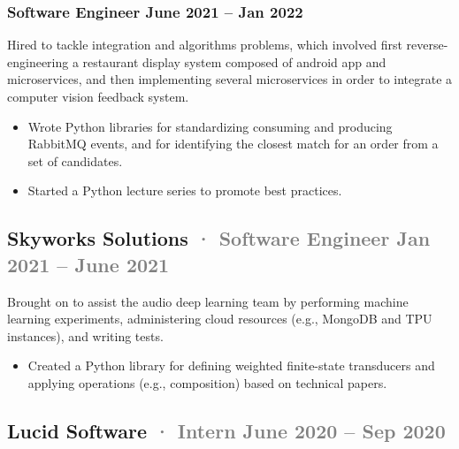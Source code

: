 \documentclass[12pt]{article} %
\providecommand{\tightlist}{%
  \setlength{\itemsep}{0pt}\setlength{\parskip}{0pt}}
\renewcommand{\emph}[1]{%
  \textcolor{gray}{#1}%
}
\begin{document}
\hypertarget{software-engineer-june-2021-jan-2022}{%
\subsubsection{\texorpdfstring{\small Software Engineer \hfill June 2021
-- Jan
2022}{Software Engineer June 2021 -- Jan 2022}}\label{software-engineer-june-2021-jan-2022}}

Hired to tackle integration and algorithms problems, which involved
first reverse-engineering a restaurant display system composed of
android app and microservices, and then implementing several
microservices in order to integrate a computer vision feedback system.

\begin{itemize}
\tightlist
\item
  Wrote Python libraries for standardizing consuming and producing
  RabbitMQ events, and for identifying the closest match for an order
  from a set of candidates.
\item
  Started a Python lecture series to promote best practices.
\end{itemize}

\hypertarget{skyworks-solutions-software-engineer-jan-2021-june-2021}{%
\subsection{\texorpdfstring{Skyworks Solutions \emph{· \small Software
Engineer \hfill Jan 2021 -- June
2021}}{Skyworks Solutions · Software Engineer Jan 2021 -- June 2021}}\label{skyworks-solutions-software-engineer-jan-2021-june-2021}}

Brought on to assist the audio deep learning team by performing machine
learning experiments, administering cloud resources (e.g., MongoDB and
TPU instances), and writing tests.

\begin{itemize}
\tightlist
\item
  Created a Python library for defining weighted finite-state
  transducers and applying operations (e.g., composition) based on
  technical papers.
\end{itemize}

\hypertarget{lucid-software-intern-june-2020-sep-2020}{%
\subsection{\texorpdfstring{Lucid Software \emph{· \small Intern
\hfill June 2020 -- Sep
2020}}{Lucid Software · Intern June 2020 -- Sep 2020}}\label{lucid-software-intern-june-2020-sep-2020}}
\end{document}
